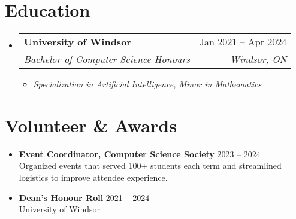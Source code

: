 \documentclass[letterpaper,11pt]{article}
\makeatletter
\newcommand{\resumeItem}[1]{
  \item\small{
    {#1 \vspace{-2pt}}
  }
}
\newcommand{\resumeSubheading}[4]{
  \vspace{-2pt}\item
    \begin{tabular*}{0.97\textwidth}[t]{l@{\extracolsep{\fill}}r}
      \textbf{#1} & #2 \\
      \textit{\small#3} & \textit{\small #4} \\
    \end{tabular*}\vspace{-7pt}
}
\newcommand{\resumeSubHeadingListStart}{\begin{itemize}[leftmargin=0.15in, label={}]}
\newcommand{\resumeSubHeadingListEnd}{\end{itemize}}
\newcommand{\resumeItemListStart}{\begin{itemize}}
\newcommand{\resumeItemListEnd}{\end{itemize}\vspace{-5pt}}
\makeatother
\begin{document}
  \section{Education}
  \resumeSubHeadingListStart
    \resumeSubheading
      {University of Windsor}{Jan 2021 -- Apr 2024}
      {Bachelor of Computer Science Honours}{Windsor, ON}
    \resumeItemListStart
      \resumeItem{\textit{Specialization in Artificial Intelligence, Minor in Mathematics}}
    \resumeItemListEnd
    
  \resumeSubHeadingListEnd  

\section{Volunteer \& Awards}
\resumeItemListStart
  \resumeItem{\textbf{Event Coordinator, Computer Science Society} \hfill 2023 -- 2024\\
              Organized events that served 100+ students each term and streamlined logistics to improve attendee experience.}
  \resumeItem{\textbf{Dean's Honour Roll} \hfill 2021 -- 2024\\
              University of Windsor}
\resumeItemListEnd

\end{document}
